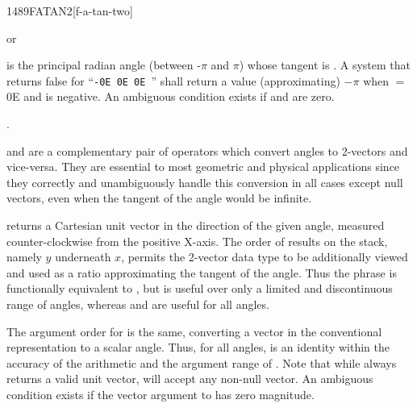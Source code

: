 
\begin{worddef}{1489}{FATAN2}[f-a-tan-two]
\item {} or

	 is the principal radian angle (between -$\pi$ and $\pi$)
	whose tangent is .
	A system that returns false for ``\texttt{-0E 0E 0E }''
	shall return a value (approximating) $-\pi$ when  $=$ 0E
	and  is negative.
	An ambiguous condition exists if  and  are
	zero.

\see {}.

	\begin{rationale} %
		 and  are a complementary pair of
		operators which convert angles to 2-vectors and vice-versa.
		They are essential to most geometric and physical applications
		since they correctly and unambiguously handle this conversion
		in all cases except null vectors, even when the tangent of the
		angle would be infinite.

		 returns a Cartesian unit vector in the direction
		of the given angle, measured counter-clockwise from the positive
		X-axis. The order of results on the stack, namely $y$ underneath
		$x$, permits the 2-vector data type to be additionally viewed
		and used as a ratio approximating the tangent of the angle.
		Thus the phrase   is functionally
		equivalent to , but is useful over only a limited
		and discontinuous range of angles, whereas  and
		 are useful for all angles.

		The argument order for  is the same, converting a
		vector in the conventional representation to a scalar angle.
		Thus, for all angles,   is an identity
		within the accuracy of the arithmetic and the argument range of
		. Note that while  always returns a
		valid unit vector,  will accept any non-null vector.
		An ambiguous condition exists if the vector argument to
		 has zero magnitude.
	\end{rationale}


\end{worddef}
